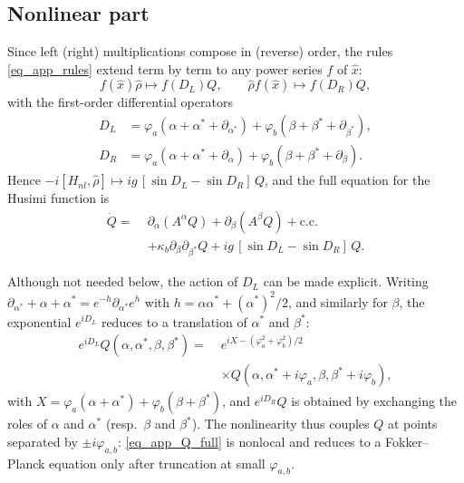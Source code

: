 \documentclass[aps,prx,reprint,floatfix,amsmath,amssymb,longbibliography]{revtex4-2}
\begin{document}
\subsection{Nonlinear part}
Since left (right) multiplications compose in (reverse) order, the rules \eqref{eq_app_rules} extend term by term to any power series $f$ of $\hat x$:
\begin{equation}
    f(\hat x)\hat\rho\mapsto f(D_L)Q,\qquad \hat\rho f(\hat x)\mapsto f(D_R)Q,
\end{equation}
with the first-order differential operators
\begin{align}
    D_L &= \varphi_a(\alpha+\alpha^*+\partial_{\alpha^*})+\varphi_b(\beta+\beta^*+\partial_{\beta^*}),\\
    D_R &= \varphi_a(\alpha+\alpha^*+\partial_{\alpha})+\varphi_b(\beta+\beta^*+\partial_{\beta}).
\end{align}
Hence $-i[H_{nl},\hat\rho]\mapsto ig\,[\sin D_L-\sin D_R]\,Q$, and the full equation for the Husimi function is
\begin{equation}
\begin{split}
    \dot Q =\;& \partial_\alpha(A^\alpha Q)+\partial_\beta(A^\beta Q)+\text{c.c.}\\
    &+\kappa_b\partial_\beta\partial_{\beta^*}Q
    +ig\,[\sin D_L-\sin D_R]\,Q .
\end{split}
\label{eq_app_Q_full}
\end{equation}

Although not needed below, the action of $D_{L}$ can be made explicit. Writing $\partial_{\alpha^*}+\alpha+\alpha^*=e^{-h}\partial_{\alpha^*}e^{h}$ with $h=\alpha\alpha^*+(\alpha^*)^2/2$, and similarly for $\beta$, the exponential $e^{iD_L}$ reduces to a translation of $\alpha^*$ and $\beta^*$:
\begin{equation}
\begin{split}
    e^{iD_L}Q(\alpha,\alpha^*,\beta,\beta^*) =\;& e^{iX-(\varphi_a^2+\varphi_b^2)/2}\\
    &\times Q(\alpha,\alpha^*+i\varphi_a,\beta,\beta^*+i\varphi_b),
\end{split}
\end{equation}
with $X=\varphi_a(\alpha+\alpha^*)+\varphi_b(\beta+\beta^*)$, and $e^{iD_R}Q$ is obtained by exchanging the roles of $\alpha$ and $\alpha^*$ (resp.\ $\beta$ and $\beta^*$). The nonlinearity thus couples $Q$ at points separated by $\pm i\varphi_{a,b}$: \cref{eq_app_Q_full} is nonlocal and reduces to a Fokker--Planck equation only after truncation at small $\varphi_{a,b}$.
\end{document}
